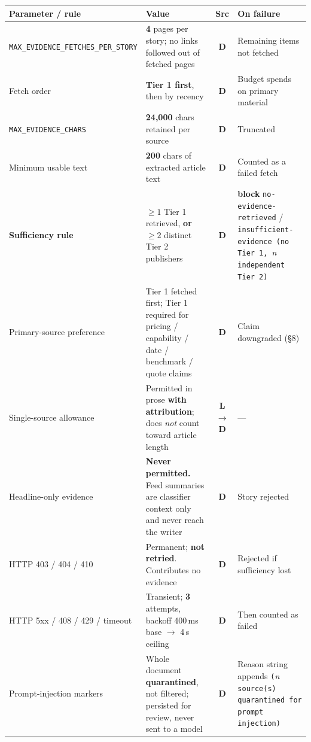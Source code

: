 \documentclass[10pt,a4paper]{article}
\newcommand{\cd}[1]{\texttt{\footnotesize\hyphenpenalty=0\exhyphenpenalty=0\relax #1}}
\newcommand{\us}{\_\discretionary{}{}{}}
\newcommand{\D}{\textcolor{go}{\textbf{D}}}
\newcommand{\LD}{\textcolor{hd}{\textbf{L$\rightarrow$D}}}
\newcommand{\BL}{\textcolor{st}{\textbf{block}}}
\begin{document}
\begin{center}\footnotesize
\begin{tabularx}{\textwidth}{@{}>{\RaggedRight}p{4.3cm} >{\RaggedRight}X c >{\RaggedRight}p{3.6cm}@{}}
\toprule
\textbf{Parameter / rule} & \textbf{Value} & \textbf{Src} & \textbf{On failure} \\
\midrule
\cd{MAX\us EVIDENCE\us}\allowbreak\cd{FETCHES\us PER\us STORY} & \textbf{4} pages per story; no links followed out of fetched pages & \D & Remaining items not fetched \\
Fetch order & \textbf{Tier 1 first}, then by recency & \D & Budget spends on primary material \\
\cd{MAX\us EVIDENCE\us CHARS} & \textbf{24{,}000} chars retained per source & \D & Truncated \\
Minimum usable text & \textbf{200} chars of extracted article text & \D & Counted as a failed fetch \\
\textbf{Sufficiency rule} & $\geq 1$ Tier 1 retrieved, \textbf{or} $\geq 2$ distinct Tier 2 publishers & \D & \BL{} \cd{no-evidence-retrieved} / \cd{insufficient-evidence (no Tier 1, }\textit{n}\cd{ independent Tier 2)} \\
Primary-source preference & Tier 1 fetched first; Tier 1 required for pricing / capability / date / benchmark / quote claims & \D & Claim downgraded (\S8) \\
Single-source allowance & Permitted in prose \textbf{with attribution}; does \emph{not} count toward article length & \LD & --- \\
Headline-only evidence & \textbf{Never permitted.} Feed summaries are classifier context only and never reach the writer & \D & Story rejected \\
HTTP 403 / 404 / 410 & Permanent; \textbf{not retried}. Contributes no evidence & \D & Rejected if sufficiency lost \\
HTTP 5xx / 408 / 429 / timeout & Transient; \textbf{3} attempts, backoff 400\,ms base $\rightarrow$ 4\,s ceiling & \D & Then counted as failed \\
Prompt-injection markers & Whole document \textbf{quarantined}, not filtered; persisted for review, never sent to a model & \D & Reason string appends \cd{(}\textit{n}\cd{ source(s) quarantined for prompt injection)} \\
\bottomrule
\end{tabularx}
\end{center}

\end{document}
